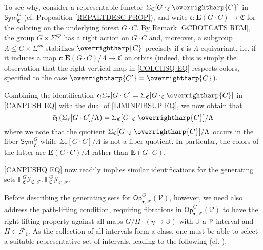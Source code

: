 \documentclass[a4paper,10pt
,draft
]{article}%
\numberwithin{equation}{section}
\numberwithin{figure}{section}
\theoremstyle{definition} %
\newcommand{\vect}[1]{\text{\overrightharp{\ensuremath{#1}}}}
\newcommand{\F}{\ensuremath{\mathcal F}}
\newcommand{\V}{\ensuremath{\mathcal V}}
\newcommand{\1}{\ensuremath{\mathbbm 1}}%
\begin{document}
To see why, 
consider a representable functor
$\Sigma_{\mathfrak{C}}[G \cdot_{\mathfrak{C}} \vect{C}]$
in
$\mathsf{Sym}^G_{\mathfrak{C}}$
(cf. Proposition \ref{REPALTDESC PROP}),
and write
$\mathfrak{c} \colon 
\boldsymbol{E}(G \cdot C) \to \mathfrak{C}$
for the coloring on the underlying forest $G \cdot C$.
By Remark \ref{GCDOTCATS REM},
the group $G \times \Sigma^{op}$
has a right action on $G \cdot C$ and, 
moreover, a subgroup
$\Lambda \leq G \times \Sigma^{op}$ stabilizes $\vect{C}$
precisely if $\mathfrak{c}$ is $\Lambda$-equivariant,
i.e. if it induces a map 
$\bar{\mathfrak{c}} \colon 
\boldsymbol{E}(G \cdot C)/\Lambda \to \mathfrak{C}$
on orbits
(indeed, this is simply the observation that the right vertical map in 
\eqref{COLCHSQ EQ} respects colors, specified to the case
$\vect{C'} = \vect{C}$).


Combining the identification
$\mathfrak{c}_! \Sigma_{\tau}[G \cdot C]
=
\Sigma_{\mathfrak{C}}[G \cdot_{\mathfrak{C}} \vect{C}]$
in 
\eqref{CANPUSH EQ}
with the dual of
\eqref{LIMINFIBSUP EQ},
we now obtain that
\begin{equation}\label{CANPUSHQ EQ}
\bar{c}_{!} 
\left(
\Sigma_{\tau}[G \cdot C]/\Lambda
\right)
=
\Sigma_{\mathfrak{C}}[G \cdot_{\mathfrak{C}} \vect{C}]/\Lambda
\end{equation}
where we note that the quotient
$\Sigma_{\mathfrak{C}}[G \cdot_{\mathfrak{C}} \vect{C}]/\Lambda$
occurs in the fiber $\mathsf{Sym}^G_{\mathfrak{C}}$
while $\Sigma_{\tau}[G \cdot C]/\Lambda$
is not a fiber quotient.
In particular, the colors of the latter are
$\boldsymbol{E}(G \cdot C)/\Lambda$
rather than $\boldsymbol{E}(G \cdot C)$.

\eqref{CANPUSHQ EQ} now readily implies similar identifications for the generating sets
$\mathbb{F}^G_{\mathfrak{C}} \mathcal{I}_{\mathfrak{C},\mathcal{F}},
\mathbb{F}^G_{\mathfrak{C}} \mathcal{J}_{\mathfrak{C},\mathcal{F}}$.




Before describing the generating sets for 
$\mathsf{Op}^G_{\bullet,\mathcal{F}}(\V)$, however,
we need also address the path-lifting condition, 
requiring fibrations in $\mathsf{Op}^G_{\bullet,\F}(\V)$ to have the right lifting property against all maps 
$G/H \cdot (\eta \to \mathbb J)$
with $\mathbb{J}$ a $\V$-interval and $H \in \F_1$.
As the collection of all intervals form a class, one must be able to select a suitable representative set of intervals, leading to the following (cf. \cite{BM13}).
\end{document}

